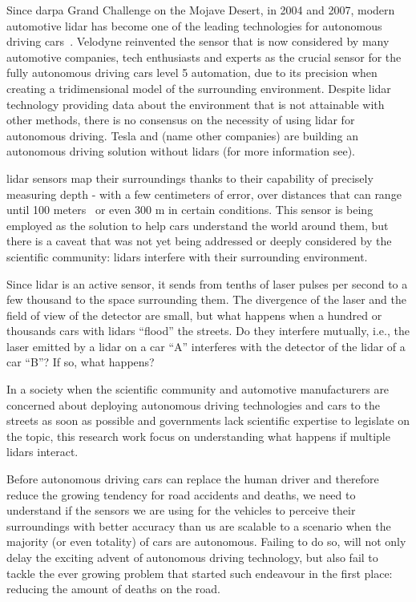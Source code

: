 Since \ac{darpa} Grand Challenge on the Mojave Desert, in 2004 and 2007, modern automotive \ac{lidar} has become one of the leading technologies for autonomous driving cars~\cite{Bezemek2017}. Velodyne reinvented the sensor that is now considered by many automotive companies, tech enthusiasts and experts as the crucial sensor for the fully autonomous driving cars level 5 automation, due to its precision when creating a tridimensional  model of the surrounding environment. Despite \ac{lidar} technology providing data about the environment that is not attainable with other methods, there is no consensus on the necessity of using \ac{lidar} for autonomous driving. Tesla and (name other companies) are building an autonomous driving solution without \acp{lidar} (for more information see). 


\ac{lidar} sensors map their surroundings thanks to their capability of precisely measuring depth - with a few centimeters of error, over distances that can range until 100 meters~\cite{vlp16, Sullivan2016} or even 300 m in certain conditions. This sensor is being employed as the solution to help cars understand the world around them, but there is a caveat that was not yet being addressed or deeply considered by the scientific community: \acp{lidar} interfere with their surrounding environment.

Since \ac{lidar} is an active sensor, it sends from tenths of laser pulses per second to a few thousand to the space surrounding them. The divergence of the laser and the field of view of the detector are small, but what happens when a hundred or thousands cars with \acp{lidar} ``flood'' the streets. Do they interfere mutually, i.e., the laser emitted by a \ac{lidar} on a car ``A'' interferes with the detector of the \ac{lidar} of a car ``B''? If so, what happens? 

In a society when the scientific community and automotive manufacturers are concerned about deploying autonomous driving technologies and cars to the streets as soon as possible and governments lack scientific expertise to legislate on the topic, this research work focus on understanding what happens if multiple \acp{lidar} interact.

Before autonomous driving cars can replace the human driver and therefore reduce the growing
tendency for road accidents and deaths, we need to understand if the sensors we are using for the vehicles to perceive their surroundings with better accuracy than us are scalable to a scenario when the majority (or even totality) of cars are autonomous. Failing to do so, will not only delay the exciting advent of autonomous driving technology, but also fail to tackle the ever growing problem that started such endeavour in the first place: reducing the amount of deaths on the road.

